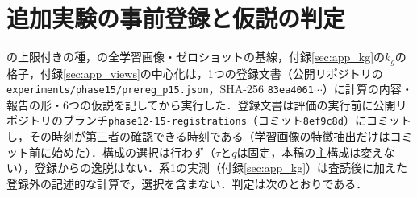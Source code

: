 \begin{table}[htbp]
\centering
\caption{種の上限$\tau{=}0.05$の規則の格子（\FPR{}[\%]，単体，3回の平均）．Storey型・単純BH法はそれぞれ上限なし／あり．種はDINOv3 L/16のビューで上限付きStorey型に選ばれた枚数（2つの折の合計）とそのうちIDの割合（\%）．}
\label{tab:caprec}
\vspace{1.5mm}

\end{table}

\section{追加実験の事前登録と仮説の判定}
\label{sec:app_hyp}
の上限付きの種，の全学習画像・ゼロショットの基線，付録\ref{sec:app_kg}の$k_g$の格子，付録\ref{sec:app_views}の中心化は，1つの登録文書（公開リポジトリの\texttt{experiments/phase15/prereg\_p15.json}，SHA-256 \texttt{83ea4061}$\cdots$）に計算の内容・報告の形・6つの仮説を記してから実行した．登録文書は評価の実行前に公開リポジトリのブランチ\texttt{phase12-15-registrations}（コミット\texttt{8ef9c8d}）にコミットし，その時刻が第三者の確認できる時刻である（学習画像の特徴抽出だけはコミット前に始めた）．構成の選択は行わず（$\tau$と$q$は固定，本稿の主構成は変えない），登録からの逸脱はない．系1の実測（付録\ref{sec:app_kg}）は査読後に加えた登録外の記述的な計算で，選択を含まない．判定は次のとおりである．
